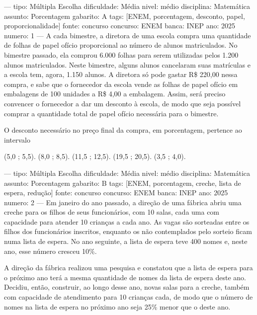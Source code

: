 
---
tipo: Múltipla Escolha
dificuldade: Média
nivel: médio
disciplina: Matemática
assunto: Porcentagem
gabarito: A
tags: [ENEM, porcentagem, desconto, papel, proporcionalidade]
fonte: concurso
concurso: ENEM
banca: INEP
ano: 2025
numero: 1
---
\question
A cada bimestre, a diretora de uma escola compra uma quantidade de folhas de papel ofício proporcional ao número de alunos matriculados. No bimestre passado, ela comprou 6.000 folhas para serem utilizadas pelos 1.200 alunos matriculados. Neste bimestre, alguns alunos cancelaram suas matrículas e a escola tem, agora, 1.150 alunos. A diretora só pode gastar R\$ 220,00 nessa compra, e sabe que o fornecedor da escola vende as folhas de papel ofício em embalagens de 100 unidades a R\$ 4,00 a embalagem. Assim, será preciso convencer o fornecedor a dar um desconto à escola, de modo que seja possível comprar a quantidade total de papel ofício necessária para o bimestre.

O desconto necessário no preço final da compra, em porcentagem, pertence ao intervalo
\begin{choices}
\CorrectChoice (5,0 ; 5,5).
\choice (8,0 ; 8,5).
\choice (11,5 ; 12,5).
\choice (19,5 ; 20,5).
\choice (3,5 ; 4,0).
\end{choices}

---
tipo: Múltipla Escolha
dificuldade: Média
nivel: médio
disciplina: Matemática
assunto: Porcentagem
gabarito: B
tags: [ENEM, porcentagem, creche, lista de espera, redução]
fonte: concurso
concurso: ENEM
banca: INEP
ano: 2025
numero: 2
---
\question
Em janeiro do ano passado, a direção de uma fábrica abriu uma creche para os filhos de seus funcionários, com 10 salas, cada uma com capacidade para atender 10 crianças a cada ano. As vagas são sorteadas entre os filhos dos funcionários inscritos, enquanto os não contemplados pelo sorteio ficam numa lista de espera. No ano seguinte, a lista de espera teve 400 nomes e, neste ano, esse número cresceu 10\%.

A direção da fábrica realizou uma pesquisa e constatou que a lista de espera para o próximo ano terá a mesma quantidade de nomes da lista de espera deste ano. Decidiu, então, construir, ao longo desse ano, novas salas para a creche, também com capacidade de atendimento para 10 crianças cada, de modo que o número de nomes na lista de espera no próximo ano seja 25\% menor que o deste ano.

